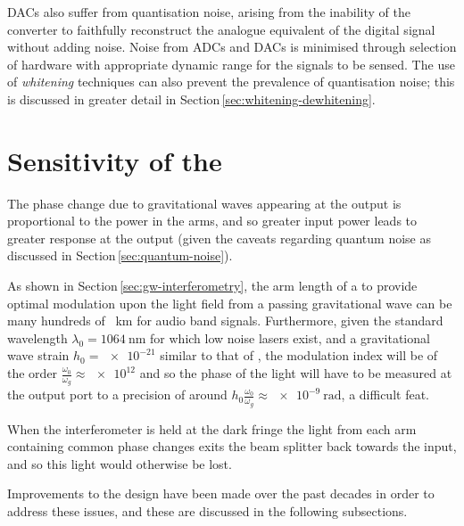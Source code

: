 \glspl{DAC} also suffer from quantisation noise, arising from the inability of the converter to faithfully reconstruct the analogue equivalent of the digital signal without adding noise. Noise from \glspl{ADC} and \glspl{DAC} is minimised through selection of hardware with appropriate dynamic range for the signals to be sensed. The use of \emph{whitening} techniques can also prevent the prevalence of quantisation noise; this is discussed in greater detail in Section\,\ref{sec:whitening-dewhitening}.

\section{\label{sec:ifo-response}Sensitivity of the \MI{}}
The phase change due to gravitational waves appearing at the output is proportional to the power in the arms, and so greater input power leads to greater response at the output (given the caveats regarding quantum noise as discussed in Section\,\ref{sec:quantum-noise}).

As shown in Section\,\ref{sec:gw-interferometry}, the arm length of a \MI{} to provide optimal modulation upon the light field from a passing gravitational wave can be many hundreds of \SI{}{\kilo\meter} for audio band signals. Furthermore, given the standard wavelength $\lambda_0 = \SI{1064}{\nano\meter}$ for which low noise lasers exist, and a gravitational wave strain $h_0 = \num{e-21}$ similar to that of \GWFIRSTEVENT{}, the modulation index will be of the order $\frac{\omega_0}{\omega_g} \approx \num{e12}$ and so the phase of the light will have to be measured at the output port to a precision of around $h_0 \frac{\omega_0}{\omega_g} \approx \SI{e-9}{\radian}$, a difficult feat.

When the interferometer is held at the dark fringe the light from each arm containing common phase changes exits the beam splitter back towards the input, and so this light would otherwise be lost.

Improvements to the \MI{} design have been made over the past decades in order to address these issues, and these are discussed in the following subsections.

